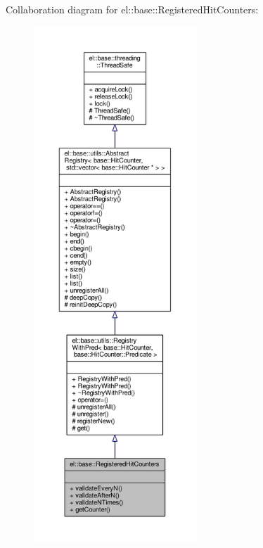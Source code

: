 Collaboration diagram for el\+:\+:base\+:\+:Registered\+Hit\+Counters\+:
\nopagebreak
\begin{figure}[H]
\begin{center}
\leavevmode
\includegraphics[height=550pt]{da/d48/classel_1_1base_1_1RegisteredHitCounters__coll__graph}
\end{center}
\end{figure}
